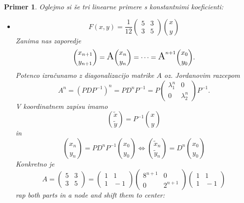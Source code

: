 \documentclass{article}
\newtheorem{primer}{Primer}
\begin{document}
\begin{primer}
Oglejmo si še tri linearne primere s konstantnimi koeficienti:
\begin{itemize}
    \item $$ F(x, y)= \frac{1}{12}\left(\begin{array}{ll}
    5 & 3 \\
    3 & 5
    \end{array}\right)\binom{x}{y}$$
Zanima nas zaporedje 
$$
\binom{x_{n+1}}{y_{n+1}} = \text{\Large A} \binom{x_n}{y_n} = \dots = \text{\Large A}^{n+1} \binom{x_0}{y_0} .
$$
Potenco izračunamo z diagonalizacijo matrike $A$ oz. Jordanovim razcepom
$$
A^n = (PDP^{-1})^n = PD^n P^{-1} = P \left(\begin{array}{ll}
    \lambda_1^n & 0 \\
    0 & \lambda_2^n
    \end{array}\right) P^{-1} .
$$
V koordinatnem zapisu imamo 
$$
\binom{\tilde{x}}{\tilde{y}} = P^{-1} \binom{x}{y} 
$$
in 
$$
\binom{x_n}{y_n} = PD^n P^{-1} \binom{x_0}{y_0} \iff \binom{\tilde{x}_n}{\tilde{y}_n} = D^n \binom{x_0}{y_0}
$$
Konkretno je 
$$
A = \left(\begin{array}{ll}
    5 & 3 \\
    3 & 5
    \end{array}\right) = \left(\begin{array}{ll}
    1 & 1 \\
    1 & \!\!\!-1
    \end{array}\right) \left(\begin{array}{ll}
    8^{n+1} & 0 \\
    0 & 2^{n+1}
    \end{array}\right)
    \left(\begin{array}{ll}
        1 & 1 \\
        1 & \!\!\!-1
    \end{array}\right)
$$
rap both parts in a node and shift them to center:

\begin{center}
\end{center}
\end{itemize}
\end{primer}
\end{document}
